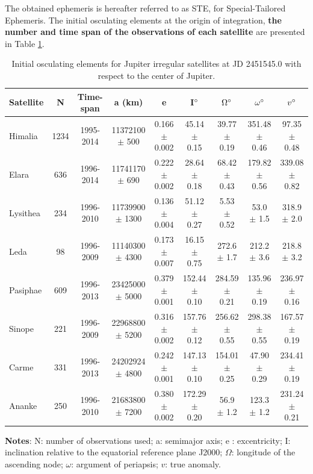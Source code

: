 \documentclass[useAMS,usenatbib]{mn2e}
\begin{document}
The obtained ephemeris is hereafter referred to as STE, for Special-Tailored Ephemeris. The initial osculating elements at the origin of integration, \textbf{the number and time span of the observations of each satellite} are presented in Table \ref{Tab: sat_ell}.

\begin{table}
\caption{Initial osculating elements for Jupiter irregular satellites at JD 2451545.0 with respect to the center of Jupiter.
 }\label{Tab: sat_ell}
\begin{center}
\begin{tabular}{lcccccccc}
\hline\hline
Satellite & N & Time-span & a (km) & e & I$\hbox{$^\circ$}$ & $\Omega\hbox{$^\circ$}$ & $\omega\hbox{$^\circ$}$ & $v\hbox{$^\circ$}$ \\ 
\hline
Himalia & 1234 & 1995-2014 &   11372100 $\pm$ 500    &    0.166 $\pm$ 0.002      &   45.14 $\pm$ 0.15      &   39.77 $\pm$ 0.19      &   351.48 $\pm$ 0.46      &   97.35 $\pm$ 0.48    \\
Elara & 636 & 1996-2014 &   11741170 $\pm$ 690  &      0.222 $\pm$ 0.002      &   28.64 $\pm$ 0.18      &   68.42 $\pm$ 0.43      &   179.82 $\pm$ 0.56      &   339.08 $\pm$ 0.82  \\
Lysithea & 234 & 1996-2010 &   11739900 $\pm$ 1300  &      0.136 $\pm$ 0.004      &    51.12 $\pm$ 0.27     &   5.53 $\pm$ 0.52      &   53.0 $\pm$ 1.5      &   318.9 $\pm$ 2.0   \\
Leda & 98 & 1996-2009 &   11140300  $\pm$ 4300  &     0.173  $\pm$ 0.007     &   16.15  $\pm$ 0.75    &   272.6  $\pm$ 1.7    &   212.2  $\pm$ 3.6          &   218.8  $\pm$ 3.2  \\
Pasiphae & 609 & 1996-2013 &  23425000  $\pm$ 5000    &     0.379  $\pm$ 0.001       &   152.44 $\pm$ 0.10      &   284.59 $\pm$ 0.21      &   135.96 $\pm$ 0.19      &   236.97 $\pm$ 0.16 \\
Sinope & 221 & 1996-2009 &   22968800 $\pm$ 5200   &     0.316 $\pm$ 0.002      &   157.76 $\pm$ 0.12      &   256.62 $\pm$ 0.55      &   298.38 $\pm$ 0.55      &   167.57 $\pm$ 0.19    \\
Carme & 331 & 1996-2013 &   24202924 $\pm$ 4800      &  0.242 $\pm$ 0.001      &   147.13 $\pm$ 0.10      &   154.01 $\pm$ 0.25      &   47.90 $\pm$ 0.29      &   234.41 $\pm$ 0.19  \\
Ananke & 250 & 1996-2010 &  21683800  $\pm$ 7200  &     0.380 $\pm$ 0.002      &   172.29 $\pm$ 0.20      &   56.9 $\pm$ 1.2      &   123.3 $\pm$ 1.2      &   231.24 $\pm$ 0.21  \\
\hline
\end{tabular} 
\end{center}
\begin{flushleft}
\textbf{Notes}: N: number of observations used; a: semimajor axis; e : excentricity; I: inclination relative to the equatorial reference plane J2000; $\Omega$: longitude of the ascending node; $\omega$: argument of periapsis; $v$: true anomaly.
\end{flushleft}
\end{table}
\end{document}
